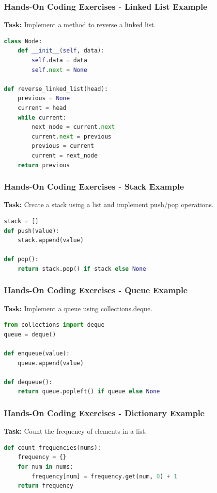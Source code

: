 \documentclass{beamer}
\begin{document}
\begin{frame}[fragile]
    \frametitle{Hands-On Coding Exercises - Linked List Example}
    \textbf{Task:} Implement a method to reverse a linked list.

    \begin{lstlisting}[language=Python]
class Node:
    def __init__(self, data):
        self.data = data
        self.next = None

def reverse_linked_list(head):
    previous = None
    current = head
    while current:
        next_node = current.next
        current.next = previous
        previous = current
        current = next_node
    return previous
    \end{lstlisting}
\end{frame}

\begin{frame}[fragile]
    \frametitle{Hands-On Coding Exercises - Stack Example}
    \textbf{Task:} Create a stack using a list and implement push/pop operations.

    \begin{lstlisting}[language=Python]
stack = []
def push(value):
    stack.append(value)

def pop():
    return stack.pop() if stack else None
    \end{lstlisting}
\end{frame}

\begin{frame}[fragile]
    \frametitle{Hands-On Coding Exercises - Queue Example}
    \textbf{Task:} Implement a queue using collections.deque.

    \begin{lstlisting}[language=Python]
from collections import deque
queue = deque()

def enqueue(value):
    queue.append(value)

def dequeue():
    return queue.popleft() if queue else None
    \end{lstlisting}
\end{frame}

\begin{frame}[fragile]
    \frametitle{Hands-On Coding Exercises - Dictionary Example}
    \textbf{Task:} Count the frequency of elements in a list.

    \begin{lstlisting}[language=Python]
def count_frequencies(nums):
    frequency = {}
    for num in nums:
        frequency[num] = frequency.get(num, 0) + 1
    return frequency
    \end{lstlisting}
\end{frame}
\end{document}
